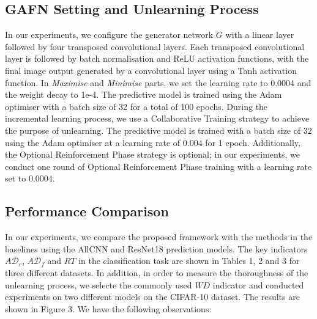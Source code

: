 \documentclass[preprint,12pt]{elsarticle}
\begin{document}
\subsection{GAFN Setting and Unlearning Process}
In our experiments, we configure the generator network \( G \) with a linear layer followed by four transposed convolutional layers. Each transposed convolutional layer is followed by batch normalisation and ReLU activation functions, with the final image output generated by a convolutional layer using a Tanh activation function. In \textit{Maximise} and \textit{Minimise} parts, we set the learning rate to 0.0004 and the weight decay to 1e-4. The predictive model is trained using the Adam optimiser with a batch size of 32 for a total of 100 epochs. During the incremental learning process, we use a Collaborative Training strategy to achieve the purpose of unlearning. The predictive model is trained with a batch size of $32$ using the Adam optimiser at a learning rate of $0.004$ for 1 epoch. Additionally, the Optional Reinforcement Phase strategy is optional; in our experiments, we conduct one round of Optional Reinforcement Phase training with a learning rate set to $0.0004$.

\subsection{Performance Comparison}
\label{subsec_performance_comparison}In our experiments, we compare the proposed framework with the methods in the baselines using the AllCNN and ResNet18 prediction models. The key indicators $A\mathcal{D}_r$, $A\mathcal{D}_f$ and $RT$ in the classification task are shown in Tables 1, 2 and 3 for three different datasets. In addition, in order to measure the thoroughness of the unlearning process, we selecte the commonly used $\textit{WD}$ indicator and conducted experiments on two different models on the CIFAR-10 dataset. The results are shown in Figure 3. We have the following observations:
\end{document}
